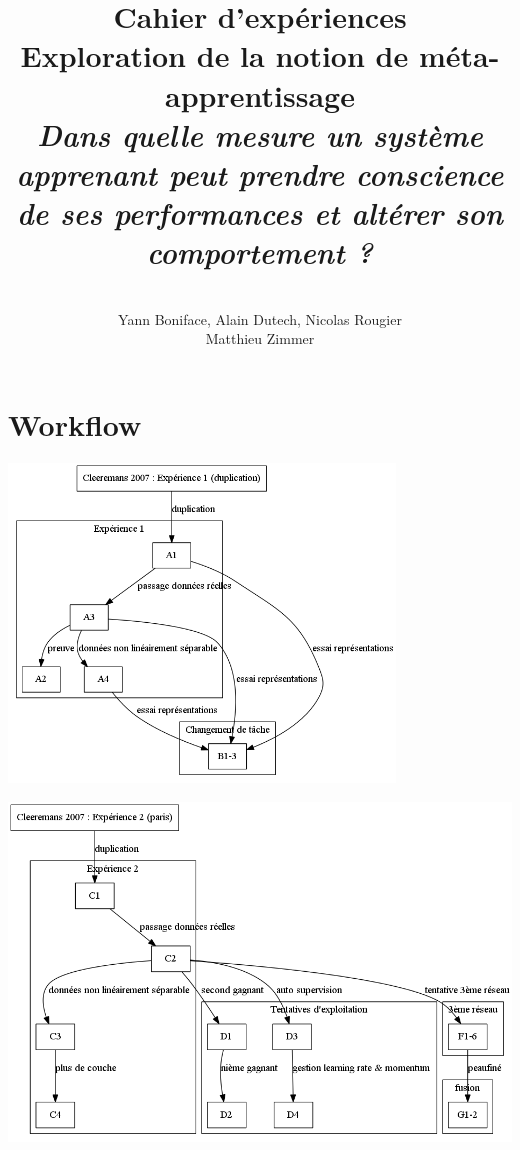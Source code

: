 \documentclass[a4paper,12pt]{article}
\title{
  \textbf{Cahier d'expériences}
  \\[5cm]
  Exploration de la notion de méta-apprentissage
  \\[3cm]
  \textit{
  Dans quelle mesure un système apprenant peut prendre conscience de ses performances
  et altérer son comportement ?}
}
\author{
  \\[3cm]
  Yann Boniface, Alain Dutech, Nicolas Rougier \\
  Matthieu Zimmer}
\begin{document}
  \maketitle
  \clearpage

  \tableofcontents

  \newpage
  

  \newpage
  \section{Workflow}
  \begin{center}
    \includegraphics[height=320px]{data/workflow2.png}
  \end{center}
  
  \hspace*{-1.9cm}
  \includegraphics[width=550px]{data/workflow3.png}
  
\end{document}
